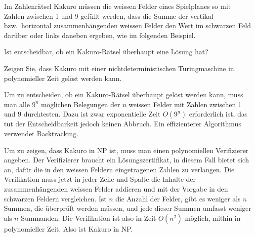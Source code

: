 Im Zahlenrätsel Kakuro müssen die weissen Felder eines Spielplanes
so mit Zahlen zwischen 1 und 9 gefüllt werden, dass die Summe der
vertikal bzw.~horizontal zusammenhängenden weissen Felder den Wert im
schwarzen Feld darüber oder links daneben ergeben, wie im folgenden
Beispiel. 
\begin{center}
\end{center}
\begin{teilaufgaben}
\item 
Ist entscheidbar, ob ein Kakuro-Rätsel überhaupt eine Lösung
hat?
\item
Zeigen Sie, dass Kakuro mit einer nichtdeterministischen Turingmaschine
in polynomieller Zeit gelöst werden kann.
\end{teilaufgaben}


\begin{loesung}
\begin{teilaufgaben}
\item
Um zu entscheiden, ob ein Kakuro-Rätsel überhaupt gelöst werden
kann, muss man alle $9^n$ möglichen Belegungen der $n$ weissen
Felder mit Zahlen zwischen 1 und 9 durchtesten. Dazu ist zwar
exponentielle Zeit $O(9^n)$ erforderlich ist, das tut der Entscheidbarkeit
jedoch keinen Abbruch.
Ein effizienterer Algorithmus verwendet Backtracking.
\item
Um zu zeigen, dass Kakuro in NP ist, muss man einen polynomiellen
Verifizierer angeben. Der Verifizierer braucht ein Lösungszertifikat,
in diesem Fall bietet sich an, dafür die in den weissen Feldern eingetragenen
Zahlen zu verlangen. Die Verifikation muss jetzt in jeder Zeile und
Spalte die Inhalte der zusammenhängenden weissen Felder addieren und 
mit der Vorgabe in den schwarzen Feldern vergleichen. Ist $n$ die Anzahl
der Felder, gibt es weniger als $n$ Summen, die überprüft werden müssen,
und jede dieser Summen umfasst weniger als $n$ Summanden. Die Verifikation
ist also in Zeit $O(n^2)$ möglich, mithin in polynomieller Zeit.
Also ist Kakuro in NP.
\qedhere
\end{teilaufgaben}
\end{loesung}

